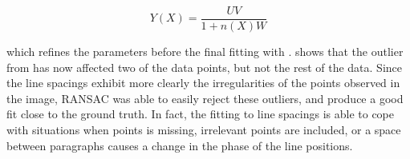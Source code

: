 \begin{equation}
Y(X) = \frac{ UV }{ 1+n(X)W }
\end{equation}

which refines the parameters before the final fitting with .
 shows that the outlier from  has now
affected two of the data points, but not the rest of the data.
Since the line spacings exhibit more clearly the irregularities of the points observed in the image,
RANSAC was able to easily reject these outliers, and produce a good fit close to the ground truth.
In fact, the fitting to line spacings is able to cope with situations
when points is missing, irrelevant points are included, or a space between paragraphs causes a change
in the phase of the line positions.

